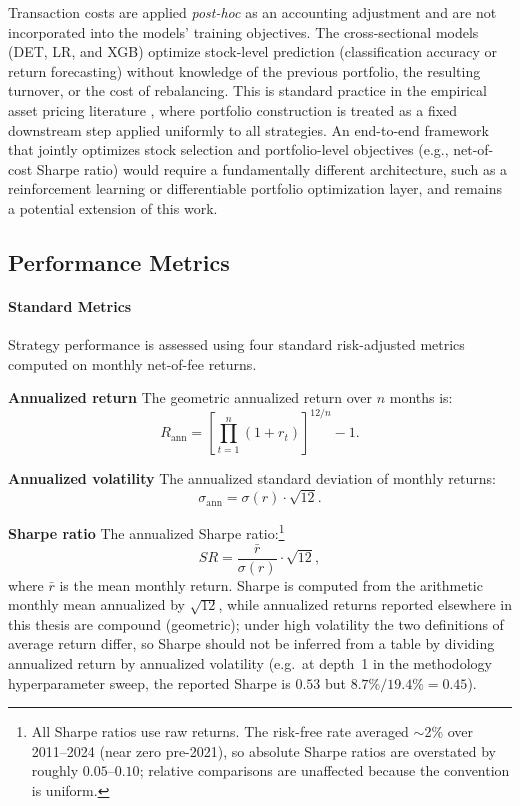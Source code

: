 Transaction costs are applied \emph{post-hoc} as an accounting adjustment and are not incorporated into the models' training objectives. The cross-sectional models (DET, LR, and XGB) optimize stock-level prediction (classification accuracy or return forecasting) without knowledge of the previous portfolio, the resulting turnover, or the cost of rebalancing. This is standard practice in the empirical asset pricing literature \citep[e.g.,][]{FamaFrench2015, GHM2023}, where portfolio construction is treated as a fixed downstream step applied uniformly to all strategies. An end-to-end framework that jointly optimizes stock selection and portfolio-level objectives (e.g., net-of-cost Sharpe ratio) would require a fundamentally different architecture, such as a reinforcement learning or differentiable portfolio optimization layer, and remains a potential extension of this work.

\subsection{Performance Metrics}\label{app:evaluation}

\paragraph{Standard Metrics}

Strategy performance is assessed using four standard risk-adjusted metrics computed on monthly net-of-fee returns.

\textbf{Annualized return} The geometric annualized return over $n$ months is:
\begin{equation}
    R_{\text{ann}} = \left[\prod_{t=1}^{n}(1 + r_t)\right]^{12/n} - 1.
\end{equation}

\textbf{Annualized volatility} The annualized standard deviation of monthly returns:
\begin{equation}
    \sigma_{\text{ann}} = \sigma(r) \cdot \sqrt{12}.
\end{equation}

\textbf{Sharpe ratio} The annualized Sharpe ratio:\footnote{All Sharpe ratios use raw returns. The risk-free rate averaged $\sim$2\% over 2011--2024 (near zero pre-2021), so absolute Sharpe ratios are overstated by roughly $0.05$--$0.10$; relative comparisons are unaffected because the convention is uniform.}
\begin{equation}
    SR = \frac{\bar{r}}{\sigma(r)} \cdot \sqrt{12},
\end{equation}
where $\bar{r}$ is the mean monthly return. Sharpe is computed from the arithmetic monthly mean annualized by $\sqrt{12}$, while annualized returns reported elsewhere in this thesis are compound (geometric); under high volatility the two definitions of average return differ, so Sharpe should not be inferred from a table by dividing annualized return by annualized volatility (e.g.\ at depth~1 in the methodology hyperparameter sweep, the reported Sharpe is $0.53$ but $8.7\% / 19.4\% = 0.45$).

